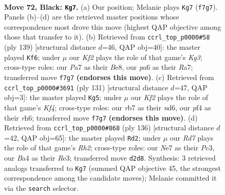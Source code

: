 \documentclass[11pt]{article}
\begin{document}
\clearpage

\begin{figure}[p]\centering
\begin{subfigure}{0.46\textwidth}\centering
\resizebox{\linewidth}{!}{%
\newchessgame
\chessboard[
  setfen={8/pR2nk2/P6R/1P3p2/b4P2/8/3r4/4b1K1 b - - 0 72},
  showmover=false,
  pgfstyle=straightmove, color=movearrow, markmove={f7-g7}
]}
\caption{}
\end{subfigure}\hfill
\begin{subfigure}{0.46\textwidth}\centering
\resizebox{\linewidth}{!}{%
\newchessgame
\chessboard[
  setfen={4b3/r7/p2p2k1/R6p/3N3P/3P2P1/5K2/8 b - - 12 70},
  showmover=false,
  pgfstyle=straightmove, color=movearrow, markmove={g6-f6}
]}
\caption{}
\end{subfigure}
\\[4pt]
\begin{subfigure}{0.46\textwidth}\centering
\resizebox{\linewidth}{!}{%
\newchessgame
\chessboard[
  setfen={8/8/P2N2nR/2p2k2/6p1/2P1p1P1/r6P/4K3 b - - 1 66},
  showmover=false,
  pgfstyle=straightmove, color=movearrow, markmove={f5-g5}
]}
\caption{}
\end{subfigure}\hfill
\begin{subfigure}{0.46\textwidth}\centering
\resizebox{\linewidth}{!}{%
\newchessgame
\chessboard[
  setfen={8/1p4r1/8/3p4/p7/PrPKR3/7R/5k2 w - - 10 69},
  showmover=false,
  pgfstyle=straightmove, color=movearrow, markmove={h2-d2}
]}
\caption{}
\end{subfigure}
\caption{\textbf{Move 72, Black: \texttt{Kg7}.} (a) Our position; Melanie plays \texttt{Kg7} (\texttt{f7g7}). Panels (b)--(d) are the retrieved master positions whose correspondence most drove this move (highest QAP objective among those that transfer to it). (b) Retrieved from \texttt{ccrl\_top\_p0000\#58} (ply 139) [structural distance $d$=46, QAP obj=40]: the master played \texttt{Kf6}; under $\mu$ our \emph{Kf2} plays the role of that game's \emph{Kg3}; cross-type roles: our \emph{P}a7 as their \emph{B}e8, our \emph{p}a6 as their \emph{R}a7; transferred move \texttt{f7g7} \textbf{(endorses this move)}. (c) Retrieved from \texttt{ccrl\_top\_p0000\#3691} (ply 131) [structural distance $d$=47, QAP obj=3]: the master played \texttt{Kg5}; under $\mu$ our \emph{Kf2} plays the role of that game's \emph{Kf4}; cross-type roles: our \emph{r}b7 as their \emph{n}d6, our \emph{p}f4 as their \emph{r}h6; transferred move \texttt{f7g7} \textbf{(endorses this move)}. (d) Retrieved from \texttt{ccrl\_top\_p0000\#868} (ply 136) [structural distance $d$=42, QAP obj=65]: the master played \texttt{Rd2}; under $\mu$ our \emph{Rd7} plays the role of that game's \emph{Rh2}; cross-type roles: our \emph{N}e7 as their \emph{P}c3, our \emph{B}a4 as their \emph{R}e3; transferred move \texttt{d2d8}. Synthesis: 3 retrieved analogs transferred to \texttt{Kg7} (summed QAP objective 45, the strongest correspondence among the candidate moves); Melanie committed it via the \texttt{search} selector.}
\label{fig:thought-m143}
\end{figure}
\end{document}
